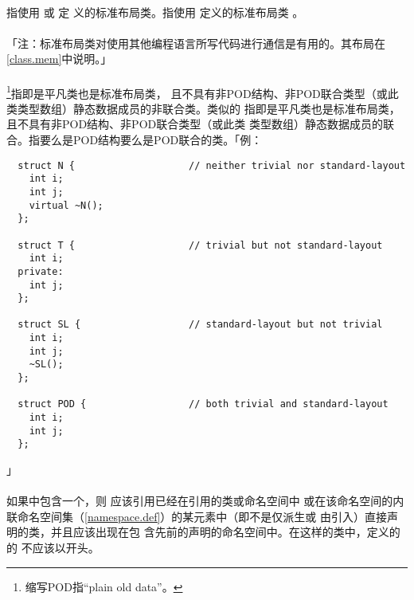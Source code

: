\paragraph{}
指使用 或  定
义的标准布局类。指使用 定义的标准布局类
。

\paragraph{}
「注：标准布局类对使用其他编程语言所写代码进行通信是有用的。其布局在
\ref{class.mem}中说明。」

\paragraph{}
\footnote{缩写POD指``plain old data''。}指即是平凡类也是标准布局类，
且不具有非POD结构、非POD联合类型（或此类类型数组）静态数据成员的非联合类。类似的
指即是平凡类也是标准布局类，且不具有非POD结构、非POD联合类型（或此类
类型数组）静态数据成员的联合。指要么是POD结构要么是POD联合的类。「例：
\begin{lstlisting}
  struct N {                    // neither trivial nor standard-layout
    int i;
    int j;
    virtual ~N();
  };

  struct T {                    // trivial but not standard-layout
    int i;
  private:
    int j;
  };

  struct SL {                   // standard-layout but not trivial
    int i;
    int j;
    ~SL();
  };

  struct POD {                  // both trivial and standard-layout
    int i;
    int j;
  };
\end{lstlisting}」

\paragraph{}
如果中包含一个，则
应该引用已经在引用的类或命名空间中
或在该命名空间的内联命名空间集（\ref{namespace.def}）的某元素中（即不是仅派生或
由引入）直接声明的类，并且应该出现在包
含先前的声明的命名空间中。在这样的类中，定义的的
不应该以开头。

